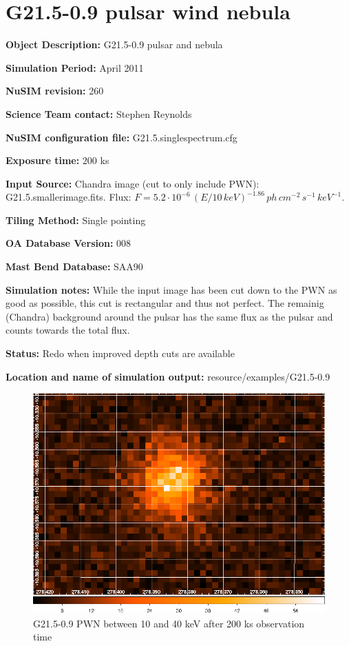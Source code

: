 
\newpage

\section{G21.5-0.9 pulsar wind nebula}

\textbf{Object Description:} G21.5-0.9 pulsar and nebula

\textbf{Simulation Period:} April 2011

\textbf{NuSIM revision:} 260

\textbf{Science Team contact:} Stephen Reynolds

\textbf{NuSIM configuration file:} G21.5.singlespectrum.cfg

\textbf{Exposure time:} 200 ks

\textbf{Input Source:} 
Chandra image (cut to only include PWN): G21.5.smallerimage.fits.
Flux: $F = 5.2\cdot10^{-6}\,(E/10\,keV)^{-1.86}\,ph\,cm^{-2}\,s^{-1}\,keV^{-1}$.

\textbf{Tiling Method:} Single pointing

\textbf{OA Database Version:} 008

\textbf{Mast Bend Database:} SAA90

\textbf{Simulation notes:} While the input image has been cut down to the PWN as good as possible, this cut is rectangular and thus not perfect. The remainig (Chandra) background around the pulsar has the same flux as the pulsar and counts towards the total flux.

\textbf{Status:} 
Redo when improved depth cuts are available

\textbf{Location and name of simulation output:} resource/examples/G21.5-0.9

\begin{figure}[h]
\begin{center}
\includegraphics[width=14cm]{G21.5-0.9/G21.png}
\caption{G21.5-0.9 PWN between 10 and 40 keV after 200 ks observation time}
\label{Vela} 
\end{center}
\end{figure}

